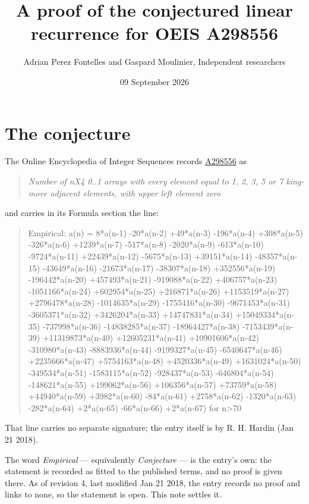 \documentclass[11pt]{article}
\title{A proof of the conjectured linear recurrence for OEIS A298556}
\author{Adrian Perez Fontelles and Gaspard Moulinier, Independent researchers}
\date{09 September 2026}
\theoremstyle{definition}
\begin{document}
\maketitle
\section{The conjecture}

The Online Encyclopedia of Integer Sequences records \href{https://oeis.org/A298556}{A298556} as

\begin{quote}\itshape Number of nX4 0..1 arrays with every element equal to 1, 2, 3, 5 or 7 king-move adjacent elements, with upper left element zero\end{quote}

and carries in its Formula section the line:

\begin{quote}\ttfamily Empirical: a(n) = 8*a(n-1) -20*a(n-2) +49*a(n-3) -196*a(n-4) +308*a(n-5) -326*a(n-6) +1239*a(n-7) -517*a(n-8) -2020*a(n-9) -613*a(n-10) -9724*a(n-11) +22439*a(n-12) -5675*a(n-13) +39151*a(n-14) -48357*a(n-15) -43649*a(n-16) -21673*a(n-17) -38307*a(n-18) +352556*a(n-19) -196442*a(n-20) +457493*a(n-21) -919088*a(n-22) +406757*a(n-23) -1051166*a(n-24) +602954*a(n-25) +216871*a(n-26) +1153519*a(n-27) +2796478*a(n-28) -1014635*a(n-29) -1755416*a(n-30) -9671453*a(n-31) -3605371*a(n-32) +3426204*a(n-33) +14747831*a(n-34) +15049334*a(n-35) -737998*a(n-36) -14838285*a(n-37) -18964427*a(n-38) -7153439*a(n-39) +11319873*a(n-40) +12605231*a(n-41) +10901606*a(n-42) -310980*a(n-43) -8883936*a(n-44) -9199327*a(n-45) -6540647*a(n-46) +2235666*a(n-47) +5754163*a(n-48) +4520336*a(n-49) +1631024*a(n-50) -349534*a(n-51) -1583115*a(n-52) -928437*a(n-53) -646804*a(n-54) -148621*a(n-55) +199062*a(n-56) +106356*a(n-57) +73759*a(n-58) +44940*a(n-59) +3982*a(n-60) -84*a(n-61) +2758*a(n-62) -1320*a(n-63) -282*a(n-64) +2*a(n-65) -66*a(n-66) +2*a(n-67) for n>70\end{quote}

That line carries no separate signature; the entry itself is by R. H. Hardin (Jan 21 2018).

The word {\itshape Empirical} --- equivalently {\itshape Conjecture} --- is the entry's own: the statement is recorded as fitted to the published terms, and no proof is given there. As of revision 4, last modified Jan 21 2018, the entry records no proof and links to none, so the statement is open. This note settles it.
\end{document}
